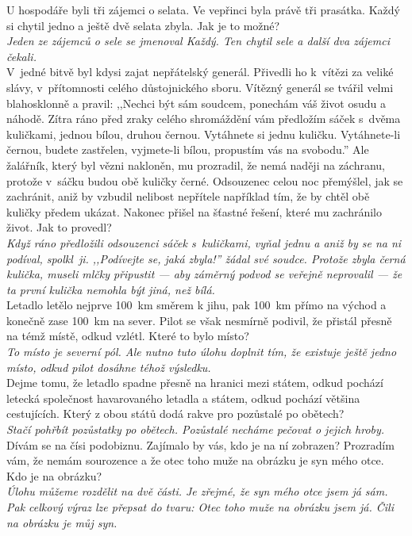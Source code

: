 \begin{multicols}{\value{columnsgames}}
\noindent
U hospodáře byli tři zájemci o selata. Ve vepřinci byla
právě tři prasátka. Každý si chytil jedno a ještě dvě selata
zbyla. Jak je to možné?\\[1 mm]
{\sl Jeden ze zájemců o sele se jmenoval Každý. Ten chytil sele
a další dva zájemci čekali.}\\

\noindent
V~jedné bitvě byl kdysi zajat nepřátelský generál. Přivedli ho
k~vítězi za veliké slávy, v~přítomnosti celého důstojnického sboru.
Vítězný generál se tvářil velmi blahosklonně a pravil: ,,Nechci být
sám soudcem, ponechám váš život osudu a náhodě. Zítra ráno před
zraky celého shromáždění vám předložím sáček s~dvěma kuličkami,
jednou bílou, druhou černou. Vytáhnete si jednu kuličku. Vytáhnete-li
černou, budete zastřelen, vyjmete-li bílou, propustím vás na svobodu.''
Ale žalářník, který byl vězni nakloněn, mu prozradil, že nemá naději
na záchranu, protože v~sáčku budou obě kuličky černé. Odsouzenec
celou noc přemýšlel, jak se zachránit, aniž by vzbudil nelibost
nepřítele například tím, že by chtěl obě kuličky předem ukázat.
Nakonec přišel na šťastné řešení, které mu zachránilo život.
Jak to provedl?\\[1 mm]
{\sl Když ráno předložili odsouzenci sáček s~kuličkami, vyňal jednu
a aniž by se na ni podíval, spolkl~ji. ,,Podívejte se, jaká zbyla!''
žádal své soudce. Protože zbyla černá kulička, museli mlčky
připustit --- aby záměrný podvod se veřejně neprovalil --- že ta
první kulička nemohla být jiná, než bílá.}\\

\noindent
Letadlo letělo nejprve 100~km směrem k jihu, pak 100~km přímo na
východ a konečně zase 100~km na sever. Pilot se však nesmírně
podivil, že přistál přesně na témž místě, odkud vzlétl.
Které to bylo místo?\\[1 mm]
{\sl To místo je severní pól. Ale nutno tuto úlohu doplnit tím,
že existuje ještě jedno místo, odkud pilot dosáhne téhož
výsledku.}\\

\noindent
Dejme tomu, že letadlo spadne přesně na hranici mezi státem,
odkud pochází letecká společnost havarovaného letadla a
státem, odkud pochází většina cestujících. Který z obou států
dodá rakve pro pozůstalé po obětech?\\[1 mm]
{\sl Stačí pohřbít pozůstatky po obětech. Pozůstalé necháme
pečovat o jejich hroby.}\\

\noindent
Dívám se na čísi podobiznu. Zajímalo by vás, kdo je na ní
zobrazen? Prozradím vám, že nemám sourozence a že otec toho
muže na obrázku je syn mého otce. Kdo je na obrázku?\\[1 mm]
{\sl Úlohu můžeme rozdělit na dvě části. Je zřejmé, že syn mého
otce jsem já sám. Pak celkový výraz lze přepsat do tvaru: Otec
toho muže na obrázku jsem já. Čili na obrázku je můj syn.}\\


\end{multicols}

